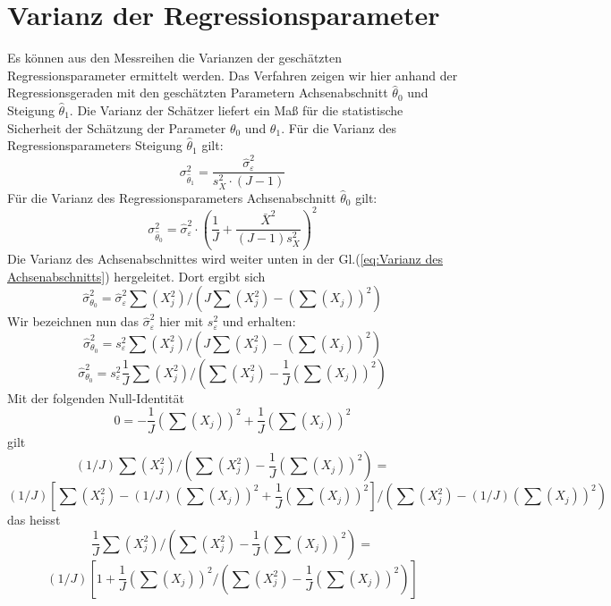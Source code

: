 \section{Varianz der Regressionsparameter}
\label{subsec:vertrauensbereiche}
Es können aus den Messreihen die Varianzen der
geschätzten Regressionsparameter ermittelt werden. Das Verfahren zeigen wir
hier anhand der Regressionsgeraden mit den geschätzten Parametern
Achsenabschnitt $\hat{\theta}_0 $ und Steigung $\hat\theta_1 $.
Die Varianz der Schätzer liefert ein Ma{\ss} f\"{u}r die statistische
Sicherheit der Sch\"{a}tzung der Parameter $\theta _0 $ und
$\theta _1 $.
Für die Varianz des Regressionsparameters Steigung $\hat{\theta}_1 $
gilt:
\begin{equation}
\sigma^2_{\hat{\theta}_1} = \frac{ \hat \sigma^2_{\varepsilon}}{s^2_X \cdot (J- 1) }
\end{equation}
Für die Varianz des Regressionsparameters Achsenabschnitt $\hat{\theta}_0 $
gilt:
\begin{equation}
\sigma^2_{\hat{\theta}_0} = \hat \sigma^2_{\varepsilon} \cdot \left(\frac{1}{J}
	+ \frac{\bar {X}^2}{(J - 1) s_X^2 }\right)^2
\end{equation}
Die Varianz des Achsenabschnittes wird weiter unten in der Gl.(\ref{eq:Varianz des Achsenabschnitts}) hergeleitet. Dort ergibt sich \begin{equation}
\hat \sigma^2_{\theta_0}  = \hat \sigma^2_{\varepsilon}  \sum(X_j^2)  / (J \sum(X_j^2) - (\sum(X_j))^2) 
\end{equation}
Wir bezeichnen nun das $\hat \sigma^2_{\varepsilon}$ hier mit $s^2_{\varepsilon}$ und erhalten:
\begin{equation}
\hat \sigma^2_{\theta_0}  = s^2_{\varepsilon} \sum(X_j^2)  / (J \sum(X_j^2) - (\sum(X_j))^2) 
\end{equation}
\begin{equation}
\hat \sigma^2_{\theta_0} = s^2_{\varepsilon} \frac{1}{J} \sum(X_j^2)  / (\sum(X_j^2) - \frac{1}{J}(\sum(X_j))^2)
\end{equation}
Mit der folgenden Null-Identität
\begin{equation}
0 =  - \frac{1}{J}(\sum(X_j))^2 + \frac{1}{J}(\sum(X_j))^2
\end{equation}
gilt
\[
(1/J) \sum(X_j^2)  / (\sum(X_j^2) - \frac{1}{J}(\sum(X_j))^2) = 
\]
\[
(1/J) [\sum(X_j^2) - (1/J)(\sum(X_j))^2 + \frac{1}{J}(\sum(X_j))^2] / (\sum(X_j^2) - (1/J)(\sum(X_j))^2)
\]
das heisst
\[
\frac{1}{J} \sum(X_j^2)  / (\sum(X_j^2) - \frac{1}{J}(\sum(X_j))^2) =
\]
\[
(1/J) [ 1 + \frac{1}{J}(\sum(X_j))^2 / (\sum(X_j^2) - \frac{1}{J}(\sum(X_j))^2) ]
\]

